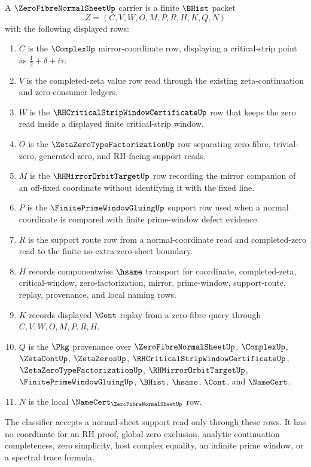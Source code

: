 \begin{definition}
\label{def:zero-fibre-normal-sheet-carrier}
A $\ZeroFibreNormalSheetUp$ carrier is a finite $\BHist$ packet
$$
Z=(C,V,W,O,M,P,R,H,K,Q,N)
$$
with the following displayed rows:
\begin{enumerate}
\item $C$ is the $\ComplexUp$ mirror-coordinate row, displaying a critical-strip point as $\frac12+\delta+i\tau$.
\item $V$ is the completed-zeta value row read through the existing zeta-continuation and zero-consumer ledgers.
\item $W$ is the $\RHCriticalStripWindowCertificateUp$ row that keeps the zero read inside a displayed finite critical-strip window.
\item $O$ is the $\ZetaZeroTypeFactorizationUp$ row separating zero-fibre, trivial-zero, generated-zero, and RH-facing support reads.
\item $M$ is the $\RHMirrorOrbitTargetUp$ row recording the mirror companion of an off-fixed coordinate without identifying it with the fixed line.
\item $P$ is the $\FinitePrimeWindowGluingUp$ support row used when a normal coordinate is compared with finite prime-window defect evidence.
\item $R$ is the support route row from a normal-coordinate read and completed-zero read to the finite no-extra-zero-sheet boundary.
\item $H$ records componentwise $\hsame$ transport for coordinate, completed-zeta, critical-window, zero-factorization, mirror, prime-window, support-route, replay, provenance, and local naming rows.
\item $K$ records displayed $\Cont$ replay from a zero-fibre query through $C,V,W,O,M,P,R,H$.
\item $Q$ is the $\Pkg$ provenance over $\ZeroFibreNormalSheetUp$, $\ComplexUp$, $\ZetaContUp$, $\ZetaZerosUp$, $\RHCriticalStripWindowCertificateUp$, $\ZetaZeroTypeFactorizationUp$, $\RHMirrorOrbitTargetUp$, $\FinitePrimeWindowGluingUp$, $\BHist$, $\hsame$, $\Cont$, and $\NameCert$.
\item $N$ is the local $\NameCert_{\ZeroFibreNormalSheetUp}$ row.
\end{enumerate}
The classifier accepts a normal-sheet support read only through these rows. It has no coordinate for an RH proof, global zero exclusion, analytic continuation completeness, zero simplicity, host complex equality, an infinite prime window, or a spectral trace formula.
\end{definition}

